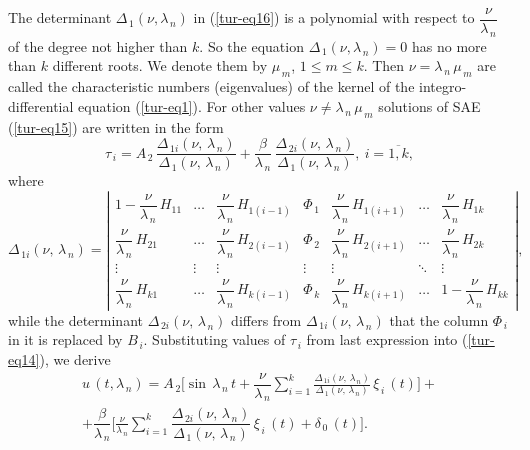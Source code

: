 ﻿\documentclass[
11pt,%
tightenlines,%
twoside,%
onecolumn,%
nofloats,%
nobibnotes,%
nofootinbib,%
superscriptaddress,%
noshowpacs,%
centertags]%
{revtex4}
\begin{document}
The determinant $\Delta_{\, 1} (\nu , \lambda_{\, n})$ in (\ref{tur-eq16}) is a polynomial with respect to $\dfrac{\nu}{\lambda_{\, n}}$ of the degree not higher than $k$.  So the equation $\Delta_{\, 1} (\nu , \lambda_{\, n})=0$ has no more than $k$ different roots. We denote them by $\mu_{\, m}$, $1 \le m \le k$. Then $\nu=\lambda_{\, n} \, \mu_{\, m}$ are called the characteristic numbers (eigenvalues) of the kernel of the integro-differential equation (\ref{tur-eq1}).	For other values $\nu \ne \lambda_{\, n} \, \mu_{\, m}$ solutions of SAE (\ref{tur-eq15}) are written in the form            
\[
\tau_{\, i }=A_{\, 2} \, \dfrac{\Delta_{\, 1 i }(\nu , \, \lambda_{\, n})}{\Delta_{\, 1} (\nu , \, \lambda_{\, n})}+\dfrac{\beta}{\lambda_{\, n}} \, \dfrac{\Delta_{\, 2 i }(\nu , \, \lambda_{\, n})}{\Delta_{\, 1} (\nu , \, \lambda_{\, n})} , \: i=\overline{1 , k} , 
\]
where 
\[
\Delta_{\, 1 i} (\nu , \, \lambda_{\, n})=\left| \begin{array}{ccccccc}
1-\dfrac{\nu}{\lambda_{\, n}} \, H_{11 } & \ldots & \dfrac{\nu}{\lambda_{\, n}} \, H_{1 (i-1) } & \Phi_{\, 1 }  & \dfrac{\nu}{\lambda_{\, n}} \, H_{1 (i+1) } & \ldots & \dfrac{\nu}{\lambda_{\, n}} \, H_{1 k }\\
\dfrac{\nu}{\lambda_{\, n}} \, H_{2 1 } & \ldots & \dfrac{\nu}{\lambda_{\, n}} \, H_{2 (i-1) }  & \Phi_{\, 2}  & \dfrac{\nu}{\lambda_{\, n}} \, H_{2 (i+1) } &  \ldots & \dfrac{\nu}{\lambda_{\, n}} \, H_{2 k } \\
\vdots &  \vdots & \vdots & \vdots & \vdots &  \ddots & \vdots \\
\dfrac{\nu}{\lambda_{\, n}} \, H_{k 1 } & \ldots & \dfrac{\nu}{\lambda_{\, n}} \, H_{k (i-1) } & \Phi_{\, k}  & \dfrac{\nu}{\lambda_{\, n}} \, H_{k (i+1) } & \ldots  & 1-\dfrac{\nu}{\lambda_{\, n}} \, H_{k k }
\end{array} \right|, 
\]
while the determinant $\Delta_{\, 2 i} (\nu , \, \lambda_{\, n})$ differs from $\Delta_{\, 1 i} (\nu , \, \lambda_{\, n})$ that the column $\Phi_{\, i}$ in it is replaced by $B_{\, i}$. Substituting values of $\tau_{\, i }$ from last expression into (\ref{tur-eq14}), we derive 	
\begin{multline} \label{tur-eq17}	
u \, (t , \lambda_{\, n})=A_{\, 2} \bigg[ \sin \, \lambda_{\, n} \, t+\dfrac{\nu}{\lambda_{\, n}} \sum \limits_{i=1}^{k}  \frac{\Delta_{\, 1 i }(\nu , \, \lambda_{\, n})}{\Delta_{\, 1} (\nu , \, \lambda_{\, n})} \, \xi_{\, i} \, (t) \bigg]+\\
+\dfrac{\beta}{\lambda_{\, n}} \bigg[ \frac{\nu}{\lambda_{\, n}} \sum \limits_{i=1}^{k}  \dfrac{\Delta_{\, 2 i }(\nu , \, \lambda_{\, n})}{\Delta_{\, 1} (\nu , \, \lambda_{\, n})} \, \xi_{\, i} \, (t)+\delta_{\, 0} \, (t) \bigg].
\end{multline} 
	
\end{document}
